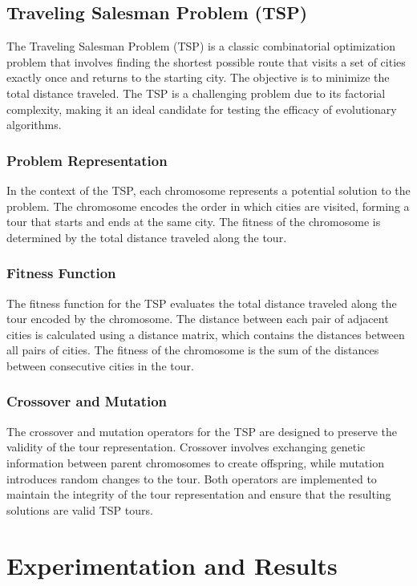 \documentclass[conference]{IEEEtran}
\begin{document}
\subsection{Traveling Salesman Problem (TSP)}
The Traveling Salesman Problem (TSP) is a classic combinatorial optimization
problem that involves finding the shortest possible route that visits a set of
cities exactly once and returns to the starting city. The objective is to
minimize the total distance traveled. The TSP is a challenging problem due to
its factorial complexity, making it an ideal candidate for testing the efficacy
of evolutionary algorithms.

\subsubsection{Problem Representation}
In the context of the TSP, each chromosome represents a potential solution to
the problem. The chromosome encodes the order in which cities are visited,
forming a tour that starts and ends at the same city. The fitness of the
chromosome is determined by the total distance traveled along the tour.

\subsubsection{Fitness Function}
The fitness function for the TSP evaluates the total distance traveled along
the tour encoded by the chromosome. The distance between each pair of adjacent
cities is calculated using a distance matrix, which contains the distances
between all pairs of cities. The fitness of the chromosome is the sum of the
distances between consecutive cities in the tour.

\subsubsection{Crossover and Mutation}
The crossover and mutation operators for the TSP are designed to preserve the
validity of the tour representation. Crossover involves exchanging genetic
information between parent chromosomes to create offspring, while mutation
introduces random changes to the tour. Both operators are implemented to
maintain the integrity of the tour representation and ensure that the resulting
solutions are valid TSP tours.

\section{Experimentation and Results}
\end{document}
